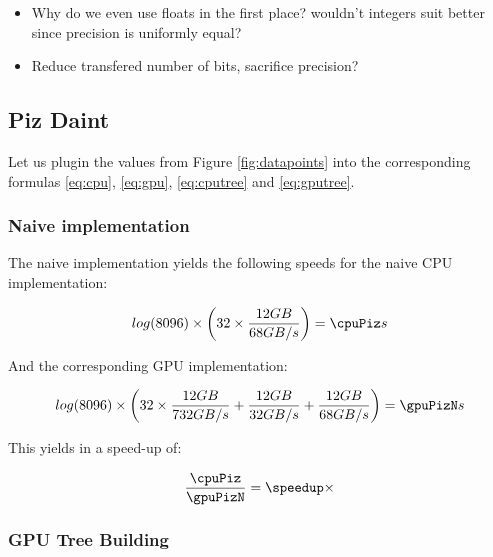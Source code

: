 \documentclass[]{article}
\begin{document}
\begin{itemize}
	\item Why do we even use floats in the first place? wouldn't integers suit better since precision is uniformly equal?
	\item Reduce transfered number of bits, sacrifice precision?
\end{itemize}



\normalfont
\subsection{Piz Daint} 

Let us plugin the values from Figure \ref{fig:datapoints} into the corresponding formulas \ref{eq:cpu}, \ref{eq:gpu}, \ref{eq:cputree} and \ref{eq:gputree}.

\subsubsection{Naive implementation}
The naive implementation yields the following speeds for the naive CPU  implementation:

\pgfmathsetmacro{}

\begin{center}
	\begin{equation}
		log(\d) \times \left ( \p \times \frac{ \s GB }{68 GB/s} \right )  = \cpuPiz s
	\end{equation}
\end{center}


And the corresponding GPU implementation:
\pgfmathsetmacro{}
\begin{center}
	\begin{equation}
		log(\d) \times \left ( 32 \times \frac{12 GB}{732 GB/s} + \frac{12 GB}{32 GB/s}  + \frac{12 GB}{68 GB/s} \right )=  \gpuPizN s
	\end{equation}
\end{center}

This yields in a speed-up of:
\pgfmathsetmacro\speedup{\cpuPiz / \gpuPizN}
\begin{center}
	\begin{equation}
		\frac{\cpuPiz}{\gpuPizN} = \speedup \times
	\end{equation}
\end{center}


\subsubsection{GPU Tree Building}
\end{document}
